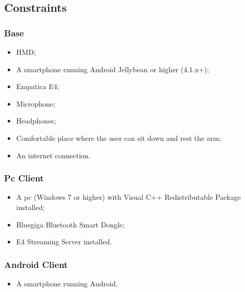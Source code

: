 \subsection{Constraints}
\subsubsection{Base}
\begin{itemize}
	\item HMD;
	\item A smartphone running Android Jellybean or higher (4.1.x+);
	\item Empatica E4;
	\item Microphone;
	\item Headphones;
	\item Comfortable place where the user can sit down and rest the arm;
	\item An internet connection.
\end{itemize}

\subsubsection{Pc Client}
\begin{itemize}
	\item A pc (Windows 7 or higher) with Visual C++ Redistributable Package installed;
	\item Bluegiga Bluetooth Smart Dongle;
	\item E4 Streaming Server installed.
\end{itemize}

\subsubsection{Android Client}
\begin{itemize}
	\item A smartphone running Android.
\end{itemize}






